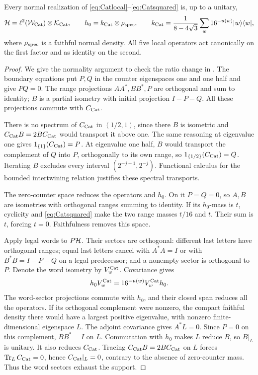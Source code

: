 \begin{lemma}\label{lem:Catclassification}
Every normal realization of \eqref{eq:Catlocal}--\eqref{eq:Catsquared} is, up to a unitary,
\[
 \mathcal H=\ell^2(\mathcal W_{\rm Cat})\otimes\mathcal K_{\rm Cat},\qquad
 h_0=k_{\mathrm{Cat}}\otimes\rho_{\rm spec},\qquad
 k_{\mathrm{Cat}}=\frac1{8-4\sqrt3}\sum_w16^{-u(w)}|w\rangle\langle w|,
\]
where $\rho_{\rm spec}$ is a faithful normal density. All five local operators act canonically on the first factor and as identity on the second.
\end{lemma}
\begin{proof}
We give the normality argument to check the ratio change in \cite[Lemma~3.1]{Entropy}. The boundary equations put $P,Q$ in the counter eigenspaces one and one half and give $PQ=0$. The range projections $AA^*,BB^*,P$ are orthogonal and sum to identity; $B$ is a partial isometry with initial projection $I-P-Q$. All these projections commute with $C_{\mathrm{Cat}}$.

There is no spectrum of $C_{\mathrm{Cat}}$ in $(1/2,1)$, since there $B$ is isometric and $C_{\mathrm{Cat}} B=2BC_{\mathrm{Cat}}$ would transport it above one. The same reasoning at eigenvalue one gives $1_{\{1\}}(C_{\mathrm{Cat}})=P$. At eigenvalue one half, $B$ would transport the complement of $Q$ into $P$, orthogonally to its own range, so $1_{\{1/2\}}(C_{\mathrm{Cat}})=Q$. Iterating $B$ excludes every interval $(2^{-j-1},2^{-j})$. Functional calculus for the bounded intertwining relation justifies these spectral transports.

The zero-counter space reduces the operators and $h_0$. On it $P=Q=0$, so $A,B$ are isometries with orthogonal ranges summing to identity. If its $h_0$-mass is $t$, cyclicity and \eqref{eq:Catsquared} make the two range masses $t/16$ and $t$. Their sum is $t$, forcing $t=0$. Faithfulness removes this space.

Apply legal words to $P\mathcal H$. Their sectors are orthogonal: different last letters have orthogonal ranges; equal last letters cancel with $A^*A=I$ or with $B^*B=I-P-Q$ on a legal predecessor; and a nonempty sector is orthogonal to $P$. Denote the word isometry by $V_w^{\rm Cat}$. Covariance gives
\[
 h_0 V_w^{\rm Cat}=16^{-u(w)}V_w^{\rm Cat}h_0.
\]
The word-sector projections commute with $h_0$, and their closed span reduces all the operators. If its orthogonal complement were nonzero, the compact faithful density there would have a largest positive eigenvalue, with nonzero finite-dimensional eigenspace $L$. The adjoint covariance gives $A^*L=0$. Since $P=0$ on this complement, $BB^*=I$ on $L$. Commutation with $h_0$ makes $L$ reduce $B$, so $B|_L$ is unitary. It also reduces $C_{\mathrm{Cat}}$. Tracing $C_{\mathrm{Cat}} B=2BC_{\mathrm{Cat}}$ on $L$ forces $\operatorname{Tr}_L C_{\mathrm{Cat}}=0$, hence $C_{\mathrm{Cat}}|_L=0$, contrary to the absence of zero-counter mass. Thus the word sectors exhaust the support.


\end{proof}
